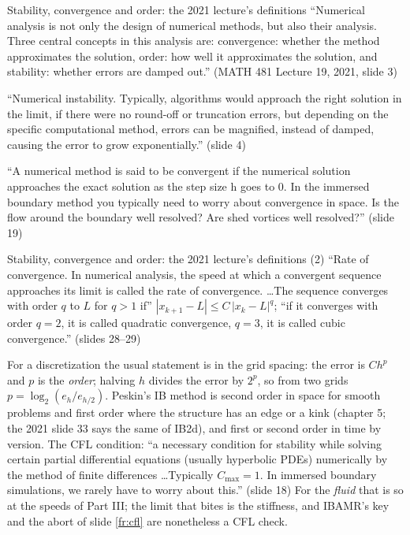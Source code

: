 \documentclass[aspectratio=169,11pt]{beamer}
\begin{document}
\begin{frame}{Stability, convergence and order: the 2021 lecture's definitions}
\label{fr:defs}
\footnotesize ``Numerical analysis is not only the design of numerical methods, but also their analysis. Three central concepts in this analysis are: convergence: whether the method approximates the solution, order: how well it approximates the solution, and stability: whether errors are damped out.'' (MATH 481 Lecture 19, 2021, slide 3)
\vspace{1mm}

\footnotesize ``Numerical instability. Typically, algorithms would approach the right solution in the limit, if there were no round-off or truncation errors, but depending on the specific computational method, errors can be magnified, instead of damped, causing the error to grow exponentially.'' (slide 4)
\vspace{1mm}

\footnotesize ``A numerical method is said to be convergent if the numerical solution approaches the exact solution as the step size h goes to 0. In the immersed boundary method you typically need to worry about convergence in space. Is the flow around the boundary well resolved? Are shed vortices well resolved?'' (slide 19)

\end{frame}

\begin{frame}{Stability, convergence and order: the 2021 lecture's definitions (2)}
\label{fr:defs2}
\footnotesize ``Rate of convergence. In numerical analysis, the speed at which a convergent sequence approaches its limit is called the rate of convergence. \ldots The sequence converges with order $q$ to $L$ for $q > 1$ if'' $|x_{k+1} - L| \le C\,|x_k - L|^q$; ``if it converges with order $q = 2$, it is called quadratic convergence, $q = 3$, it is called cubic convergence.'' (slides 28--29)
\vspace{1mm}

\footnotesize For a discretization the usual statement is in the grid spacing: the error is $C h^p$ and $p$ is the \emph{order}; halving $h$ divides the error by $2^p$, so from two grids $p = \log_2(e_h/e_{h/2})$. Peskin's IB method is second order in space for smooth problems and first order where the structure has an edge or a kink (chapter 5; the 2021 slide 33 says the same of IB2d), and first or second order in time by version. The CFL condition: ``a necessary condition for stability while solving certain partial differential equations (usually hyperbolic PDEs) numerically by the method of finite differences \ldots Typically $C_{\max} = 1$. In immersed boundary simulations, we rarely have to worry about this.'' (slide 18) For the \emph{fluid} that is so at the speeds of Part III; the limit that bites is the stiffness, and IBAMR's  key and the abort of slide \ref{fr:cfl} are nonetheless a CFL check.
\end{frame}
\end{document}
